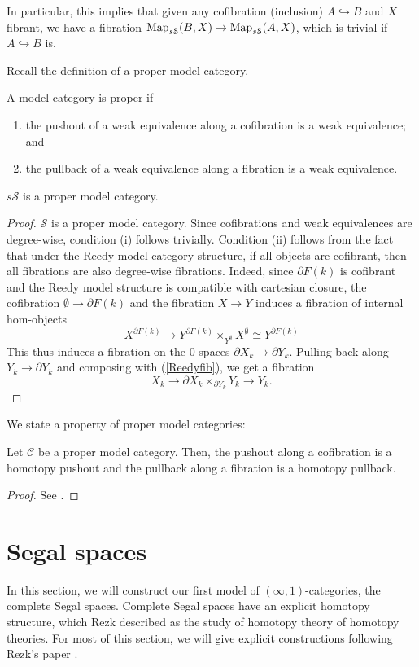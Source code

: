 \begin{refsection}
In particular, this implies that given any cofibration (inclusion) $A\hookrightarrow B$ and $X$ fibrant, we have a fibration $\operatorname{\mathrm{Map}}_{s\mathcal S}(B,X)\to\operatorname{\mathrm{Map}}_{s\mathcal S}(A,X)$, which is trivial if $A\hookrightarrow B$ is.

Recall the definition of a proper model category.
\begin{defin}
A model category is proper if
\begin{enumerate}
\item the pushout of a weak equivalence along a cofibration is a weak equivalence; and
\item the pullback of a weak equivalence along a fibration is a weak equivalence.
\end{enumerate}
\end{defin}

\begin{prop}
$s\mathcal S$ is a proper model category.
\end{prop}
\begin{proof}
$\mathcal S$ is a proper model category. Since cofibrations and weak equivalences are degree-wise, condition (i) follows trivially.
Condition (ii) follows from the fact that under the Reedy model category structure, if all objects are cofibrant, then all fibrations are also degree-wise fibrations. Indeed, since $\partial F(k)$ is cofibrant and the Reedy model structure is compatible with cartesian closure, the cofibration $\emptyset\to\partial F(k)$ and the fibration $X\to Y$ induces a fibration of internal hom-objects
$$X^{\partial F(k)}\to Y^{\partial F(k)}\times_{Y^\emptyset}X^\emptyset\cong Y^{\partial F(k)}$$
This thus induces a fibration on the 0-spaces $\partial X_k\to\partial Y_k$. Pulling back along $Y_k\to\partial Y_k$ and composing with (\ref{Reedyfib}), we get a fibration
$$X_k\to\partial X_k\times_{\partial Y_k}Y_k\to Y_k.$$
\end{proof}

We state a property of proper model categories:

\begin{prop}\label{hompullback}
  Let $\mathcal{C}$ be a proper model category. Then, the pushout along a cofibration is a homotopy pushout and the pullback along a fibration is a homotopy pullback.
\end{prop}
\begin{proof}
See \cite[Prop A.2.2.4]{htt}.
\end{proof}

\section{Segal spaces}
In this section, we will construct our first model of $(\infty,1)$-categories, the complete Segal spaces. Complete Segal spaces have an explicit homotopy structure, which Rezk described as the study of homotopy theory of homotopy theories. For most of this section, we will give explicit constructions following Rezk's paper \cite{rezk}.


\end{refsection}
